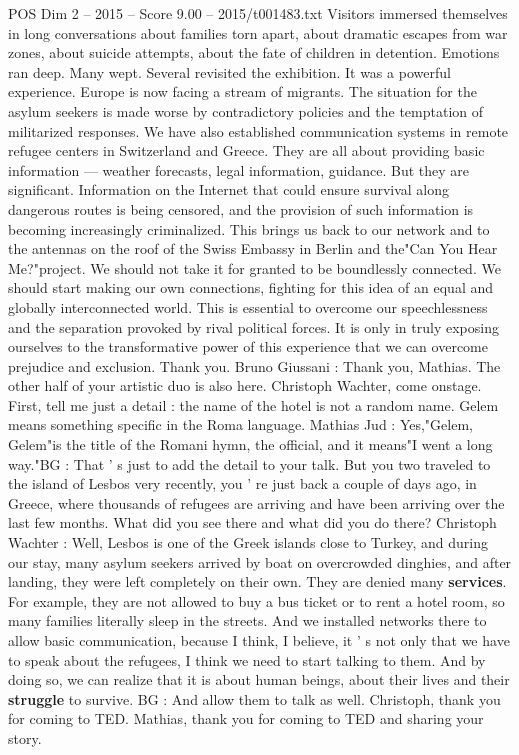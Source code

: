 \begin{textsample}{POS Dim 2 – 2015 – Score 9.00 – 2015/t001483.txt}
Visitors immersed themselves in long conversations about families torn apart, about dramatic escapes from war zones, about suicide attempts, about the fate of children in detention.
Emotions ran deep.
Many wept.
Several revisited the exhibition.
It was a powerful experience.
Europe is now facing a stream of migrants.
The situation for the asylum seekers is made worse by contradictory policies and the temptation of militarized responses.
We have also established communication systems in remote refugee centers in Switzerland and Greece.
They are all about providing basic information — weather forecasts, legal information, guidance.
But they are significant.
Information on the Internet that could ensure survival along dangerous routes is being censored, and the provision of such information is becoming increasingly criminalized.
This brings us back to our network and to the antennas on the roof of the Swiss Embassy in Berlin and the"Can You Hear Me?"project.
We should not take it for granted to be boundlessly connected.
We should start making our own connections, fighting for this idea of an equal and globally interconnected world.
This is essential to overcome our speechlessness and the separation provoked by rival political forces.
It is only in truly exposing ourselves to the transformative power of this experience that we can overcome prejudice and exclusion.
Thank you.
Bruno Giussani : Thank you, Mathias.
The other half of your artistic duo is also here.
Christoph Wachter, come onstage.
First, tell me just a detail : the name of the hotel is not a random name.
Gelem means something specific in the Roma language.
Mathias Jud : Yes,"Gelem, Gelem"is the title of the Romani hymn, the official, and it means"I went a long way."BG : That ' s just to add the detail to your talk.
But you two traveled to the island of Lesbos very recently, you ' re just back a couple of days ago, in Greece, where thousands of refugees are arriving and have been arriving over the last few months.
What did you see there and what did you do there?
Christoph Wachter : Well, Lesbos is one of the Greek islands close to Turkey, and during our stay, many asylum seekers arrived by boat on overcrowded dinghies, and after landing, they were left completely on their own.
They are denied many \textbf{services}.
For example, they are not allowed to buy a bus ticket or to rent a hotel room, so many families literally sleep in the streets.
And we installed networks there to allow basic communication, because I think, I believe, it ' s not only that we have to speak about the refugees, I think we need to start talking to them.
And by doing so, we can realize that it is about human beings, about their lives and their \textbf{struggle} to survive.
BG : And allow them to talk as well.
Christoph, thank you for coming to TED.
Mathias, thank you for coming to TED and sharing your story.

\end{textsample}
